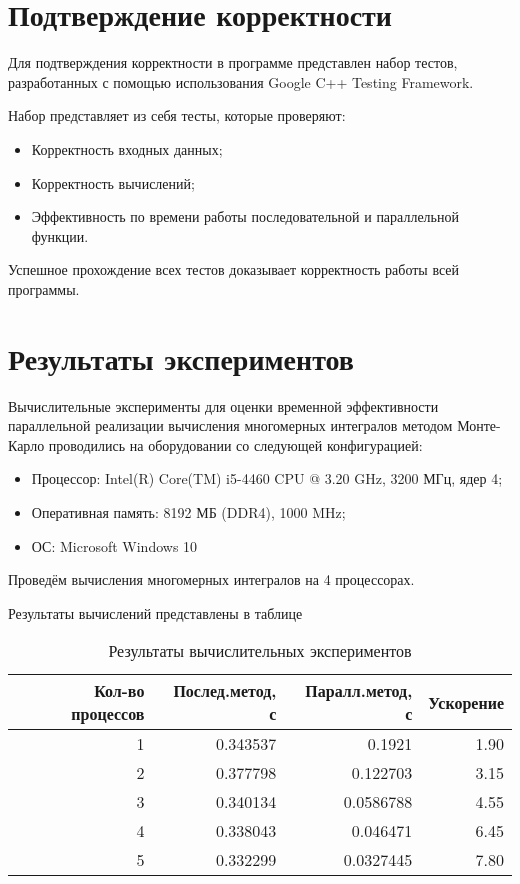 \documentclass{report}
\begin{document}
\section*{Подтверждение корректности}
Для подтверждения корректности в программе представлен набор тестов, разработанных с помощью использования Google C++ Testing Framework.
\par Набор представляет из себя тесты, которые проверяют:
\begin{itemize}
\item Корректность входных данных;
\item Корректность вычислений;
\item Эффективность по времени работы последовательной и параллельной функции.
\end{itemize}
\par Успешное прохождение всех тестов доказывает корректность работы всей программы.
\newpage

\section*{Результаты экспериментов}
Вычислительные эксперименты для оценки временной эффективности параллельной реализации вычисления многомерных интегралов методом Монте-Карло проводились на оборудовании со следующей конфигурацией:

\begin{itemize}
\item Процессор: Intel(R) Core(TM) i5-4460 CPU @ 3.20 GHz, 3200 МГц, ядер 4;
\item Оперативная память: 8192 МБ (DDR4), 1000 MHz;
\item ОС: Microsoft Windows 10 
\end{itemize}

\par Проведём вычисления многомерных интегралов на 4 процессорах. 
\par Результаты вычислений представлены в таблице

\begin{table}[!h]
\caption{Результаты вычислительных экспериментов}
\centering
\begin{tabular}{| r | r | r | r |}
\hline
Кол-во процессов & Послед.метод, с & Паралл.метод, с & Ускорение  \\[5pt]
\hline
1        & 0.343537        & 0.1921     & 1.90       \\
2        & 0.377798        & 0.122703     & 3.15       \\
3        & 0.340134        & 0.0586788     & 4.55       \\
4        & 0.338043        & 0.046471     & 6.45       \\
5        & 0.332299        & 0.0327445     & 7.80	  \\
\hline
\end{tabular}
\end{table}
\end{document}
